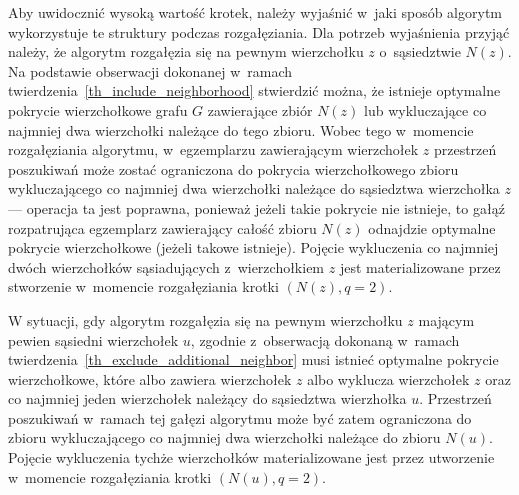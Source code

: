 \par{
  Aby uwidocznić wysoką wartość krotek, należy wyjaśnić w~jaki sposób algorytm wykorzystuje te struktury podczas rozgałęziania.
  Dla potrzeb wyjaśnienia przyjąć należy, że algorytm rozgałęzia się na pewnym wierzchołku $z$ o~sąsiedztwie $N(z)$.
  Na podstawie obserwacji dokonanej w~ramach twierdzenia~\ref{th_include_neighborhood} stwierdzić można, że istnieje optymalne pokrycie wierzchołkowe grafu $G$ zawierające zbiór $N(z)$ lub wykluczające co najmniej dwa wierzchołki należące do tego zbioru.
  Wobec tego w~momencie rozgałęziania algorytmu, w~egzemplarzu zawierającym wierzchołek $z$ przestrzeń poszukiwań może zostać ograniczona do pokrycia wierzchołkowego zbioru wykluczającego co najmniej dwa wierzchołki należące do sąsiedztwa wierzchołka $z$ --- operacja ta jest poprawna, ponieważ jeżeli takie pokrycie nie istnieje, to gałąź rozpatrująca egzemplarz zawierający całość zbioru $N(z)$ odnajdzie optymalne pokrycie wierzchołkowe (jeżeli takowe istnieje).
  Pojęcie wykluczenia co najmniej dwóch wierzchołków sąsiadujących z~wierzchołkiem $z$ jest materializowane przez stworzenie w~momencie rozgałęziania krotki $(N(z), q=2)$.

  W sytuacji, gdy algorytm rozgałęzia się na pewnym wierzchołku $z$ mającym pewien sąsiedni wierzchołek $u$, zgodnie z~obserwacją dokonaną w~ramach twierdzenia~\ref{th_exclude_additional_neighbor} musi istnieć optymalne pokrycie wierzchołkowe, które albo zawiera wierzchołek $z$ albo wyklucza wierzchołek $z$ oraz co najmniej jeden wierzchołek należący do sąsiedztwa wierzhołka $u$.
  Przestrzeń poszukiwań w~ramach tej gałęzi algorytmu może być zatem ograniczona do zbioru wykluczającego co najmniej dwa wierzchołki należące do zbioru $N(u)$.
  Pojęcie wykluczenia tychże wierzchołków materializowane jest przez utworzenie w~momencie rozgałęziania krotki $(N(u), q=2)$.
}
